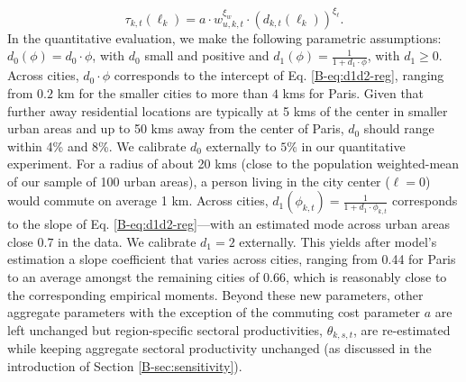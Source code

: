 \documentclass[11pt]{report}
\begin{document}
\begin{equation}
\tau_{k,t}(\ell_k)=a\cdot w_{u,k,t}^{\xi_w}\cdot(d_{k,t}(\ell_k))^{\xi_\ell}. \label{B-eq:d1d2-reg}
\end{equation}
In the quantitative evaluation, we make the following parametric assumptions: $d_0(\phi)=d_0\cdot\phi$, with $d_0$ small and positive and $d_1(\phi)=\frac{1}{1+d_1\cdot\phi}$, with $d_1 \geq 0$. Across cities, $d_0\cdot\phi$ corresponds to the intercept of Eq. \ref{B-eq:d1d2-reg}, ranging from $0.2$ km for the smaller cities to more than $4$ kms for Paris. Given that further away residential locations are typically at 5 kms of the center in smaller urban areas and up to 50 kms away from the center of Paris, $d_0$ should range within 4\% and 8\%. We calibrate $d_0$ externally to $5\%$ in our quantitative experiment. For a radius of about 20 kms (close to the population weighted-mean of our sample of 100 urban areas), a person living in the city center ($\ell=0$) would commute on average 1 km. Across cities, $d_1(\phi_{k,t})=\frac{1}{1+d_1\cdot\phi_{k,t}}$ corresponds to the slope of Eq. \ref{B-eq:d1d2-reg}---with an estimated mode across urban areas close $0.7$ in the data. We calibrate $d_1=2$ externally. This yields after model's estimation a slope coefficient that varies across cities, ranging from 0.44 for Paris to an average amongst the remaining cities of 0.66, which is reasonably close to the corresponding empirical moments. Beyond these new parameters, other aggregate parameters with the exception of the commuting cost parameter $a$ are left unchanged but region-specific sectoral productivities, $\theta_{k,s,t}$, are re-estimated while keeping aggregate sectoral productivity unchanged (as discussed in the introduction of Section \ref{B-sec:sensitivity}).

\end{document}
